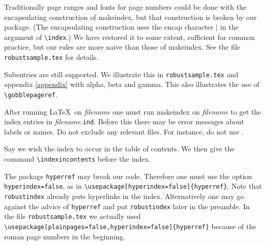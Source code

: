 \documentclass{book}
\begin{document}
Traditionally page ranges and fonts for page numbers could be done with the
encapsulating construction of makeindex, but that construction is broken by our
package.
(The encapsulating construction uses the encap character $|$ in the argument of
\verb|\index|.)
We have restored it to some extent, sufficient for common practice,
but our rules are more naive than those of makeindex.
See the file \verb|robustsample.tex| for details.

Subentries are still supported. We illustrate this in
\verb|robustsample.tex| and appendix \ref{appendix} with alpha, beta and gamma.
This also illustrates the use of \verb|\gobblepageref|.

After running \LaTeX\ on {\it filename} one must run makeindex on {\it
filename} to get the index entries in {\it filename}.\texttt{ind}.
Before this there may be error messages about labels or names.
Do not exclude any relevant files. For instance, do not use
\verb||.

Say we wish the index to occur in the table of contents.
We then give the command \verb|\indexincontents| before the index.

The package \verb|hyperref| may break our code. Therefore
one must use the option
\verb|hyperindex=false|, as in
\verb|\usepackage[hyperindex=false]{hyperref}|.
Note that \verb|robustindex| already puts
hyperlinks in the index. Alternatively one may go against the advice of
\verb|hyperref| and put \verb|robustindex| later in the preamble.
In the file \verb|robustsample.tex| we actually used
\verb|\usepackage[plainpages=false,hyperindex=false]{hyperref}|
because of the roman page numbers in the beginning.
\end{document}
